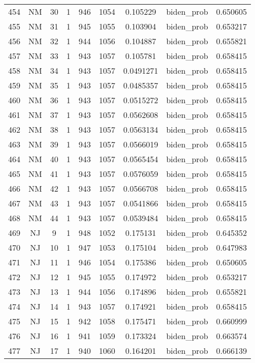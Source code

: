 \documentclass[12pt,a4paper]{article}
\begin{document}
\begin{tabular}{r|cccccccc}
	454 & NM & 30 & 1 & 946 & 1054 & 0.105229 & biden\_prob & 0.650605 \\
	455 & NM & 31 & 1 & 945 & 1055 & 0.103904 & biden\_prob & 0.653217 \\
	456 & NM & 32 & 1 & 944 & 1056 & 0.104887 & biden\_prob & 0.655821 \\
	457 & NM & 33 & 1 & 943 & 1057 & 0.105781 & biden\_prob & 0.658415 \\
	458 & NM & 34 & 1 & 943 & 1057 & 0.0491271 & biden\_prob & 0.658415 \\
	459 & NM & 35 & 1 & 943 & 1057 & 0.0485357 & biden\_prob & 0.658415 \\
	460 & NM & 36 & 1 & 943 & 1057 & 0.0515272 & biden\_prob & 0.658415 \\
	461 & NM & 37 & 1 & 943 & 1057 & 0.0562608 & biden\_prob & 0.658415 \\
	462 & NM & 38 & 1 & 943 & 1057 & 0.0563134 & biden\_prob & 0.658415 \\
	463 & NM & 39 & 1 & 943 & 1057 & 0.0566019 & biden\_prob & 0.658415 \\
	464 & NM & 40 & 1 & 943 & 1057 & 0.0565454 & biden\_prob & 0.658415 \\
	465 & NM & 41 & 1 & 943 & 1057 & 0.0576059 & biden\_prob & 0.658415 \\
	466 & NM & 42 & 1 & 943 & 1057 & 0.0566708 & biden\_prob & 0.658415 \\
	467 & NM & 43 & 1 & 943 & 1057 & 0.0541866 & biden\_prob & 0.658415 \\
	468 & NM & 44 & 1 & 943 & 1057 & 0.0539484 & biden\_prob & 0.658415 \\
	469 & NJ & 9 & 1 & 948 & 1052 & 0.175131 & biden\_prob & 0.645352 \\
	470 & NJ & 10 & 1 & 947 & 1053 & 0.175104 & biden\_prob & 0.647983 \\
	471 & NJ & 11 & 1 & 946 & 1054 & 0.175386 & biden\_prob & 0.650605 \\
	472 & NJ & 12 & 1 & 945 & 1055 & 0.174972 & biden\_prob & 0.653217 \\
	473 & NJ & 13 & 1 & 944 & 1056 & 0.174896 & biden\_prob & 0.655821 \\
	474 & NJ & 14 & 1 & 943 & 1057 & 0.174921 & biden\_prob & 0.658415 \\
	475 & NJ & 15 & 1 & 942 & 1058 & 0.175471 & biden\_prob & 0.660999 \\
	476 & NJ & 16 & 1 & 941 & 1059 & 0.173324 & biden\_prob & 0.663574 \\
	477 & NJ & 17 & 1 & 940 & 1060 & 0.164201 & biden\_prob & 0.666139 \\

\end{tabular}
\end{document}
